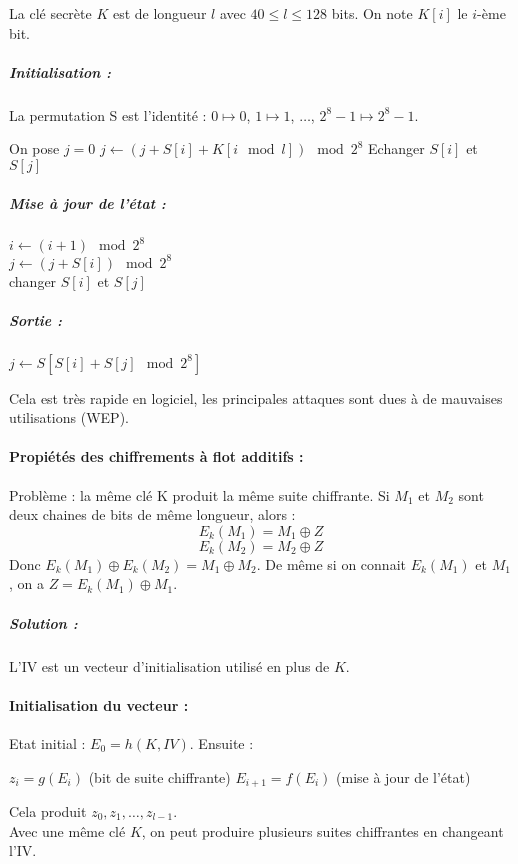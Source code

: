 \documentclass[12pt,a4paper]{report}
\begin{document}
\begin{figure}[h]
	\centering
  \scalebox{0.6}{}	
\end{figure}

La clé secrète $K$ est de longueur $l$ avec $40 \leqslant l \leqslant 128$ bits. On note $K[i]$ le $i$-ème bit.
\subparagraph{Initialisation :\\}
La permutation S est l'identité : $0 \mapsto 0$, $1 \mapsto 1$, $\ldots$, $2^8-1 \mapsto 2^8-1$.\\
\begin{algorithmic}
\STATE On pose $j=0$
\STATE $j \leftarrow (j + S[i]+K[i \mod l]) \mod 2^8$
\STATE Echanger $S[i]$ et $S[j]$
\ENDFOR
\end{algorithmic}

\subparagraph{Mise à jour de l'état :\\}
 $i \leftarrow (i+1) \mod 2^8$\\
 $j \leftarrow (j+S[i]) \mod 2^8$\\
 changer $S[i]$ et $S[j]$\\

\subparagraph{Sortie :\\}
$j \leftarrow S[S[i]+S[j] \mod 2^8]$
\begin{figure}[h]
	\centering
  \scalebox{0.6}{}	
\end{figure}

Cela est très rapide en logiciel, les principales attaques sont dues à de mauvaises utilisations (WEP).
\paragraph{Propiétés des chiffrements à flot additifs :\\}
Problème : la même clé K produit la même suite chiffrante. Si $M_1$ et $M_2$ sont deux chaines de bits de même longueur, alors :
$$ E_k(M_1) = M_1 \oplus Z $$
$$ E_k(M_2) = M_2 \oplus Z $$
Donc $E_k(M_1) \oplus E_k(M_2) = M_1 \oplus M_2$. De même si on connait $E_k(M_1)$ et $M_1$, on a $Z = E_k(M_1)\oplus M_1$.
\subparagraph{Solution :\\}
L'IV est un vecteur d'initialisation utilisé en plus de $K$.
\paragraph{Initialisation du vecteur :\\}
Etat initial : $E_0 = h(K, IV)$. Ensuite :
\begin{algorithmic}
\STATE $z_i = g(E_i)$ (bit de suite chiffrante)
\STATE $E_{i+1} = f(E_i)$ (mise à jour de l'état)
\ENDFOR
\end{algorithmic}
Cela produit $z_0,z_1, \ldots, z_{l-1}$.\\
Avec une même clé $K$, on peut produire plusieurs suites chiffrantes en changeant l'IV.
\end{document}
